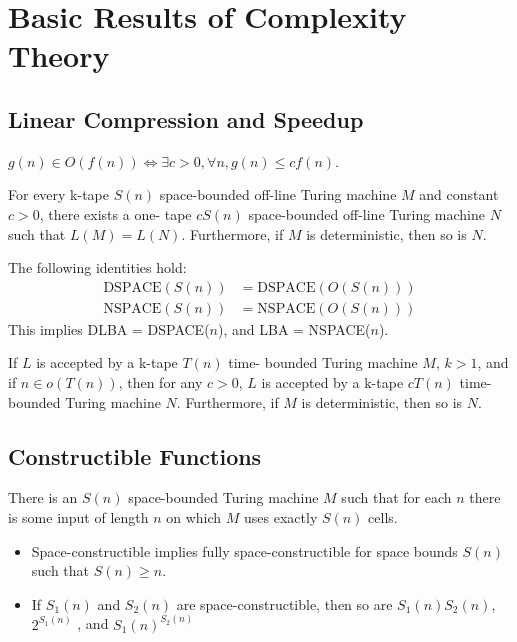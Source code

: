 \section{Basic Results of Complexity Theory}


\subsection{Linear Compression and Speedup}

 $g(n) \in O(f(n)) \Leftrightarrow \exists c > 0, \forall n,
g(n) \le cf(n)$.

 For every k-tape
$S(n)$
space-bounded off-line Turing machine $M$ and constant $c > 0$, there exists a one-
tape $cS(n)$ space-bounded off-line Turing machine $N$ such that $L(M) = L(N)$.
Furthermore, if $M$ is deterministic, then so is $N$.

 The following identities hold:
\begin{align*}
\text{DSPACE}(S(n)) &= \text{DSPACE}(O(S(n)))\\
\text{NSPACE}(S(n)) &= \text{NSPACE}(O(S(n)))
\end{align*}
This implies DLBA = DSPACE($n$), and LBA = NSPACE($n$).

 If $L$ is accepted by a k-tape $T(n)$ time-
bounded Turing machine $M$, $k > 1$, and if $n \in o(T(n))$, then for any $c
> 0$, $L$ is
accepted by a k-tape $cT(n)$ time-bounded Turing machine $N$. Furthermore, if
$M$ is
deterministic, then so is $N$.

\subsection{Constructible Functions}

 There is an $S(n)$ space-bounded Turing
machine $M$ such that for each $n$ there is some input of length $n$ on which
$M$ uses
exactly $S(n)$ cells.


\begin{itemize}
  \item Space-constructible implies fully
    space-constructible for
    space bounds $S(n)$ such that $S(n) \ge n$.
  \item If $S_1(n)$ and $S_2(n)$ are space-constructible, then so are
    $S_1(n)S_2(n)$, $2^{S_1(n)}$ , and $S_1(n)^{S_2(n)}$
\end{itemize}

